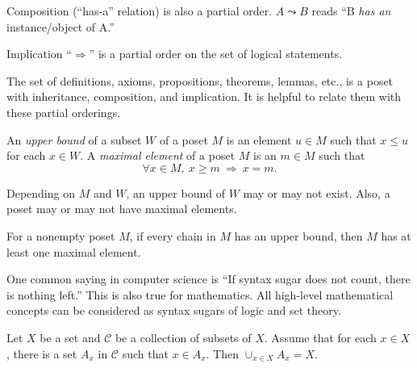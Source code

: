 \begin{exm}
   \label{exm:composition}
  Composition (``has-a'' relation) is also a partial order.
  $A \leadsto B$ reads
  ``B \emph{has an} instance/object of A.''
\end{exm}

\begin{exm}
  Implication ``$\Rightarrow$''
  is a partial order on the set of logical statements.
\end{exm}

\begin{exm}
  The set of definitions, axioms,
  propositions, theorems, lemmas, etc., 
  is a poset with inheritance, composition, and implication.
  It is helpful to relate them with these partial orderings.
\end{exm}

\begin{defn}
  \label{def:UpperBoundAndMaximalElementOfPoset}
  An \emph{upper bound} of a subset $W$ of a poset $M$
  is an element $u\in M$ such that
  $x\le u$ for each $x\in W$.
  A \emph{maximal element} of a poset $M$
  is an $m\in M$ such that
  \begin{equation}
    \label{eq:maximalElementOfPoset}
    \forall x\in M,\ x\ge m \ \Rightarrow\ x=m.
  \end{equation}
\end{defn}

\begin{rem}
  Depending on $M$ and $W$,
  an upper bound of $W$ may or may not exist.
  Also,
  a poset may or may not have maximal elements.
\end{rem}

\begin{axm}
  \label{axm:ZornLemm}
  For a nonempty poset $M$,
  if every chain in $M$ has an upper bound,
  then $M$ has at least one maximal element.
\end{axm}

\begin{rem}
  One common saying in computer science is 
  ``If syntax sugar does not count, there is nothing left.''
  This is also true for mathematics. 
  All high-level mathematical concepts
  can be considered as syntax sugars
  of logic and set theory.
\end{rem}

\begin{lem}
  \label{lem:UnionLemma}
  Let $X$ be a set and $\mathcal{C}$ be a collection of subsets of $X$.
  Assume that for each $x\in X$,
  there is a set $A_x$ in $\mathcal{C}$
  such that $x\in A_x$. Then $\cup_{x\in X}A_x=X$. 
\end{lem}


